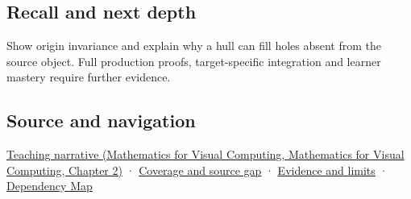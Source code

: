 \subsection{Recall and next depth}\label{appendix-0026ec42c9d5-recall-and-next-depth}

Show origin invariance and explain why a hull can fill holes absent from the source object. Full production proofs, target-specific integration and learner mastery require further evidence.

\subsection{Source and navigation}\label{appendix-0026ec42c9d5-source-and-navigation}

\href{../02-Mathematics-for-Visual-Computing/main.pdf\#nameddest=01-foundations-i-ch018-weighted-points-lead-from-affine-geometry-to-collision-shapes}{Teaching narrative (Mathematics for Visual Computing, Mathematics for Visual Computing, Chapter 2)} · \hyperref[appendix-fd090d982a15-phase-6---parts-501-600]{Coverage and source gap} · \hyperref[appendix-a103e7846d21-phase-6---source-analysis-and-verification]{Evidence and limits} · \hyperref[appendix-4ad47bdd269a]{Dependency Map}

